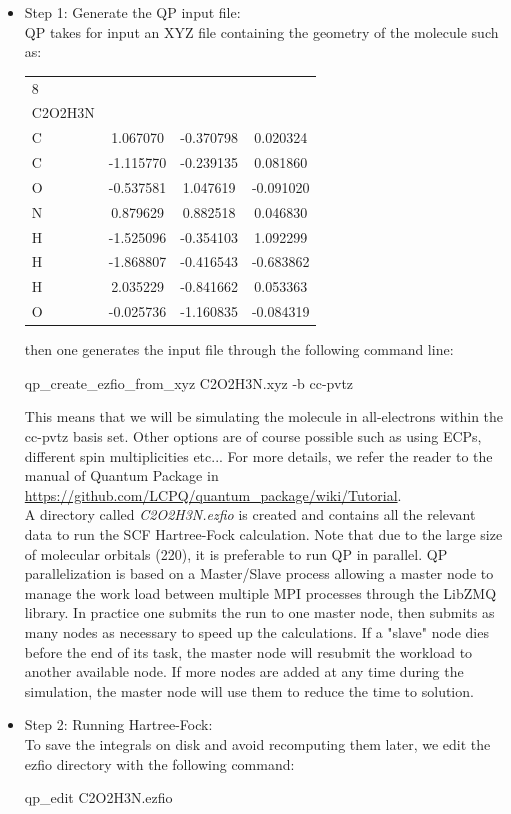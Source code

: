 \begin{itemize}
\item Step 1: Generate the QP input file:\\
QP takes for input an XYZ file containing the geometry of the molecule such as:

\begin{center}
\begin{tabular}{ l c c c }
8\\
C2O2H3N\\
C &       1.067070 &  -0.370798 &   0.020324\\
C &      -1.115770 &  -0.239135 &   0.081860\\
O &      -0.537581 &   1.047619 &  -0.091020\\
N &       0.879629 &   0.882518 &   0.046830\\
H &      -1.525096 &  -0.354103 &   1.092299\\
H &      -1.868807 &  -0.416543 &  -0.683862\\
H &       2.035229 &  -0.841662 &   0.053363\\
O &      -0.025736 &  -1.160835 &  -0.084319   
\end{tabular}
\end{center}

then one generates the input file through the following command line:\\

\begin{shade}
qp_create_ezfio_from_xyz C2O2H3N.xyz -b cc-pvtz 
\end{shade}

 
This means that we will be simulating the molecule in all-electrons within the cc-pvtz basis set. Other options are of course possible such as using ECPs, different spin multiplicities etc... For more details, we refer the reader to the manual of Quantum Package in \url{https://github.com/LCPQ/quantum_package/wiki/Tutorial}.\\
A directory called \textit{C2O2H3N.ezfio} is created and contains all the relevant data to run the SCF Hartree-Fock calculation. Note that due to the large size of molecular orbitals (220), it is preferable to run QP in parallel. QP parallelization is based on a Master/Slave process allowing a master node to manage the work load between multiple MPI processes through the LibZMQ library. In practice one submits the run to one master node, then submits as many nodes as necessary to speed up the calculations. If a "slave" node dies before the end of its task, the master node will resubmit the workload to another available node. If more nodes are added at any time during the simulation, the master node will use them to reduce the time to solution.\\
\item Step 2: Running Hartree-Fock:\\
To save the integrals on disk and avoid recomputing them later, we edit the ezfio directory with the following command:\\
\begin{shade}
qp_edit C2O2H3N.ezfio 
\end{shade}


\end{itemize}
